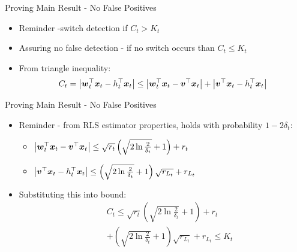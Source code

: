 \documentclass{beamer}
\begin{document}
%
%



\begin{frame}{Proving Main Result - No False Positives}
\begin{itemize}
\item Reminder -switch detection if $C_t>K_t$\newline
\item Assuring no false detection - if no switch occurs than $C_t\leq K_t$\newline
\item From triangle inequality:
\begin{equation*}
C_t=\left\vert{{\boldsymbol{w}}}^{\top}_{t}{\boldsymbol{x}}_{t}-h_{t}^{\top}{\boldsymbol{x}}_{t}\right\vert\leq\left\vert{{\boldsymbol{w}}}^{\top}_{t}{\boldsymbol{x}}_{t}-{{\boldsymbol{v}}}^{\top}{\boldsymbol{x}}_{t}\right\vert+\left\vert{{\boldsymbol{v}}}^{\top}{\boldsymbol{x}}_{t}-h_{t}^{\top}{\boldsymbol{x}}_{t}\right\vert
\end{equation*}
\end{itemize}
\end{frame}




\begin{frame}{Proving Main Result - No False Positives}
\begin{itemize}
\item Reminder - from RLS estimator properties, holds with probability $1-2\delta_t$:\newline
\begin{itemize}
\item $\left\vert{{\boldsymbol{w}}}^{\top}_{t}{\boldsymbol{x}}_{t}-{{\boldsymbol{v}}}^{\top}{\boldsymbol{x}}_{t}\right\vert\leq\sqrt{r_t}\left(\sqrt{2\ln{\frac{2}{\delta_t}}}+1\right)+r_t$\newline
\item $\left\vert{{\boldsymbol{v}}}^{\top}{\boldsymbol{x}}_{t}-h_{t}^{\top}{\boldsymbol{x}}_{t}\right\vert\leq\left(\sqrt{2\ln{\frac{2}{\delta_t}}}+1\right)\sqrt{r_{L_t}}+r_{L_t}$\newline
\end{itemize}
\item Substituting this into bound:
\begin{eqnarray*}
&&C_t\leq\sqrt{r_t}\left(\sqrt{2\ln{\frac{2}{\delta_t}}}+1\right)+r_t\\
&&+\left(\sqrt{2\ln{\frac{2}{\delta_t}}}+1\right)\sqrt{r_{L_t}}+r_{L_t}\leq K_t
\end{eqnarray*}
\end{itemize}
\end{frame}
\end{document}

